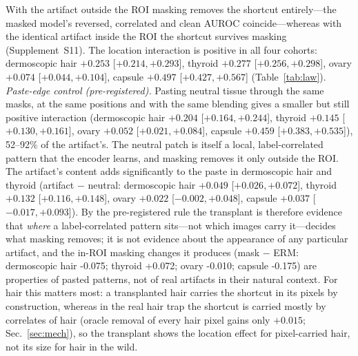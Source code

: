 With the artifact outside the ROI masking removes the shortcut entirely---the masked model's reversed, correlated and clean AUROC coincide---whereas with the identical artifact inside the ROI the shortcut survives masking (Supplement~S11). The location interaction is positive in all four cohorts: dermoscopic hair $+0.253$ [$+0.214, +0.293$], thyroid $+0.277$ [$+0.256, +0.298$], ovary $+0.074$ [$+0.044, +0.104$], capsule $+0.497$ [$+0.427, +0.567$] (Table~\ref{tab:law}). \emph{Paste-edge control (pre-registered).} Pasting neutral tissue through the same masks, at the same positions and with the same blending gives a smaller but still positive interaction (dermoscopic hair $+0.204$ [$+0.164, +0.244$], thyroid $+0.145$ [$+0.130, +0.161$], ovary $+0.052$ [$+0.021, +0.084$], capsule $+0.459$ [$+0.383, +0.535$]), 52--92\% of the artifact's. The neutral patch is itself a local, label-correlated pattern that the encoder learns, and masking removes it only outside the ROI. The artifact's content adds significantly to the paste in dermoscopic hair and thyroid (artifact $-$ neutral: dermoscopic hair $+0.049$ [$+0.026, +0.072$], thyroid $+0.132$ [$+0.116, +0.148$], ovary $+0.022$ [$-0.002, +0.048$], capsule $+0.037$ [$-0.017, +0.093$]). By the pre-registered rule the transplant is therefore evidence that \emph{where} a label-correlated pattern sits---not which images carry it---decides what masking removes; it is not evidence about the appearance of any particular artifact, and the in-ROI masking changes it produces (mask $-$ ERM: dermoscopic hair -0.075; thyroid +0.072; ovary -0.010; capsule -0.175) are properties of pasted patterns, not of real artifacts in their natural context. For hair this matters most: a transplanted hair carries the shortcut in its pixels by construction, whereas in the real hair trap the shortcut is carried mostly by correlates of hair (oracle removal of every hair pixel gains only $+0.015$; Sec.~\ref{sec:mech}), so the transplant shows the location effect for pixel-carried hair, not its size for hair in the wild.%
